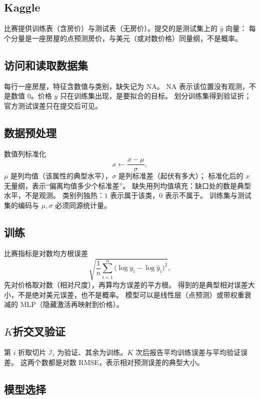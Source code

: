 \subsection{Kaggle}

比赛提供训练表（含房价）与测试表（无房价）。提交的是测试集上的 $\hat{y}$ 向量：
每个分量是一座房屋的点预测房价，与美元（或对数价格）同量纲，不是概率。

\subsection{访问和读取数据集}

每行一座房屋，特征含数值与类别，缺失记为 $\mathrm{NA}$。
$\mathrm{NA}$ 表示该位置没有观测，不是数值 $0$。价格 $y$ 只在训练集出现，是要拟合的目标。
划分训练集得到验证折；官方测试误差只在提交后可见。

\subsection{数据预处理}

数值列标准化
\[
x\leftarrow\frac{x-\mu}{\sigma},
\]
$\mu$ 是列均值（该属性的典型水平），$\sigma$ 是列标准差（起伏有多大）；
标准化后的 $x$ 无量纲，表示“偏离均值多少个标准差”。
缺失用列均值填充：缺口处的数是典型水平，不是观测。
类别列独热：$1$ 表示属于该类，$0$ 表示不属于。
训练集与测试集的编码与 $\mu,\sigma$ 必须同源统计量。

\subsection{训练}

比赛指标是对数均方根误差
\[
\sqrt{\frac{1}{n}\sum_{i=1}^{n}\bigl(\log y_{i}-\log\hat{y}_{i}\bigr)^{2}},
\]
先对价格取对数（相对尺度），再算均方误差的平方根。
得到的是典型相对误差大小，不是绝对美元误差，也不是概率。
模型可以是线性层（点预测）或带权重衰减的 MLP（隐藏激活再映射到价格）。

\subsection{\texorpdfstring{$K$折交叉验证}{K折交叉验证}}

第 $i$ 折取切片 $\mathcal{I}_{i}$ 为验证、其余为训练。$K$ 次后报告平均训练误差与平均验证误差。
这两个数都是对数 RMSE，表示相对预测误差的典型大小。

\subsection{模型选择}

